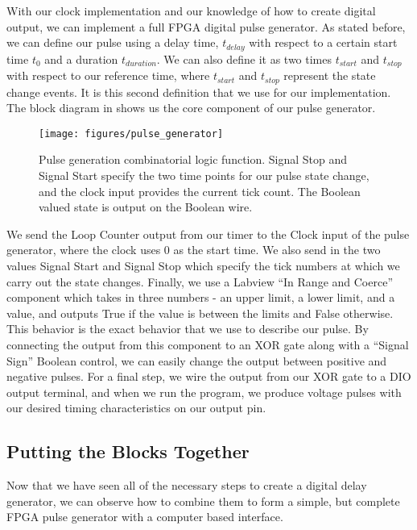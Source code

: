 With our clock implementation and our knowledge of how to create digital
output, we can implement a full FPGA digital pulse generator.  As stated
before, we can define our pulse using a delay time, $t_{delay} $ with respect
to a certain start time $t_0$ and a duration $t_{duration}$.  We can also
define it as two times $t_{start}$ and $t_{stop}$ with respect to our
reference time, where $t_{start}$ and $t_{stop}$ represent the state change
events.  It is this second definition that we use for our implementation.  The
block diagram in  shows us the core component of our pulse generator.

\begin{figure}[!ht] 
 \centering 
 \texttt{[image: figures/pulse\_generator]} 
 \caption[Pulse Generator]{Pulse generation combinatorial logic function.  Signal Stop and Signal Start specify the two time points for our pulse state change, and the clock input provides the current tick count.  The Boolean valued state is output on the Boolean wire.} 
 \label{fig:pulse_generator} 
\end{figure}


We send the Loop Counter output from our timer to the Clock input of the pulse
generator, where the clock uses 0 as the start time.  We also send in the two
values Signal Start and Signal Stop which specify the tick numbers at which we
carry out the state changes.  Finally, we use a Labview ``In Range and
Coerce'' component which takes in three numbers - an upper limit, a lower limit, and a value, and outputs True if the value is between the limits and False otherwise.  This behavior is the exact behavior that we use to describe our pulse.  By connecting the output from this component to an XOR gate along with a ``Signal Sign'' Boolean control, we can easily change the output between positive and negative pulses.  For a final step, we wire the output from our XOR gate to a DIO output terminal, and when we run the program, we produce voltage pulses with our desired timing characteristics on our output pin.

\subsection{Putting the Blocks Together} 

Now that we have seen all of the necessary steps to create a digital delay generator, we can observe how to combine them to form a simple, but complete FPGA pulse generator with a computer based interface.

